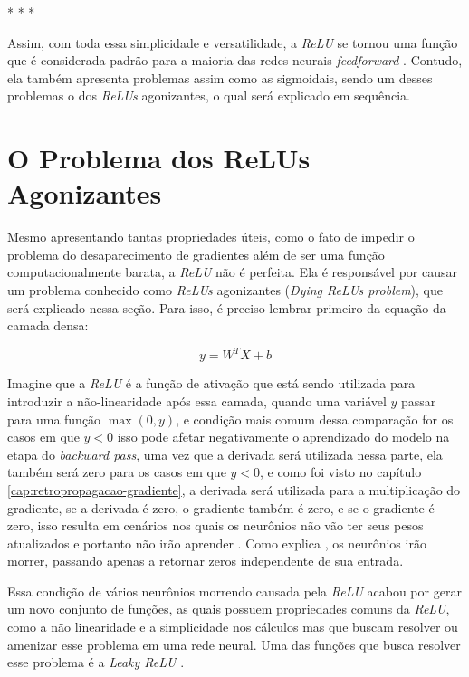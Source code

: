 \medskip
\begin{center}
 * * *
\end{center}
\medskip

Assim, com toda essa simplicidade e versatilidade, a \textit{ReLU} se tornou uma função que é considerada padrão para a maioria das redes neurais \textit{feedforward} \parencite{DeepLearningBook}. Contudo, ela também apresenta problemas assim como as sigmoidais, sendo um desses problemas o dos \textit{ReLUs} agonizantes, o qual será explicado em sequência.

\section{O Problema dos ReLUs Agonizantes}

Mesmo apresentando tantas propriedades úteis, como o fato de impedir o problema do desaparecimento de gradientes além de ser uma função computacionalmente barata, a \textit{ReLU} não é perfeita. Ela é responsável por causar um problema conhecido como \textit{ReLUs} agonizantes (\textit{Dying ReLUs problem}), que será explicado nessa seção. Para isso, é preciso lembrar primeiro da equação da camada densa:

\[
    y = W^T  X + b
\]

Imagine que a \textit{ReLU} é a função de ativação que está sendo utilizada para introduzir a não-linearidade após essa camada, quando uma variável $y$ passar para uma função $\max(0, y)$, e condição mais comum dessa comparação for os casos em que $y < 0$ isso pode afetar negativamente o aprendizado do modelo na etapa do \textit{backward pass}, uma vez que a derivada será utilizada nessa parte, ela também será zero para os casos em que $y < 0$, e como foi visto no capítulo \ref{cap:retropropagacao-gradiente}, a derivada será utilizada para a multiplicação do gradiente, se a derivada é zero, o gradiente também é zero, e se o gradiente é zero, isso resulta em cenários nos quais os neurônios não vão ter seus pesos atualizados e portanto não irão aprender \parencite{DyingReluDouglas}. Como explica \textcite{DyingReluDouglas}, os neurônios irão morrer, passando apenas a retornar zeros independente de sua entrada.

Essa condição de vários neurônios morrendo causada pela \textit{ReLU} acabou por gerar um novo conjunto de funções, as quais possuem propriedades comuns da \textit{ReLU}, como a não linearidade e a simplicidade nos cálculos mas que buscam resolver ou amenizar esse problema em uma rede neural. Uma das funções que busca resolver esse problema é a \textit{Leaky ReLU} \parencite{DyingReluDouglas}.

